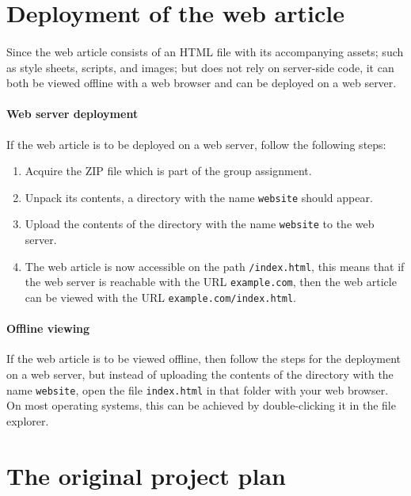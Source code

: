 \documentclass[12pt, a4paper]{article}
\begin{document}
	\section{Deployment of the web article}
		\paragraph{}
			Since the web article consists of an HTML file with its accompanying assets; such as style sheets, scripts, and images; but does not rely on server-side code, it can both be viewed offline with a web browser and can be deployed on a web server.
		\paragraph{Web server deployment}
			If the web article is to be deployed on a web server, follow the following steps:
			\begin{enumerate}
				\item Acquire the ZIP file which is part of the group assignment.
				\item Unpack its contents, a directory with the name \texttt{website} should appear.
				\item Upload the contents of the directory with the name \texttt{website} to the web server.
				\item The web article is now accessible on the path \texttt{/index.html}, this means that if the web server is reachable with the URL \texttt{example.com}, then the web article can be viewed with the URL \texttt{example.com/index.html}.
			\end{enumerate}
		\paragraph{Offline viewing}
			If the web article is to be viewed offline, then follow the steps for the deployment on a web server, but instead of uploading the contents of the directory with the name \texttt{website}, open the file \texttt{index.html} in that folder with your web browser. On most operating systems, this can be achieved by double-clicking it in the file explorer.
	\section{The original project plan}
\end{document}
